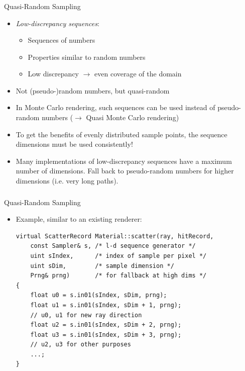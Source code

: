 \documentclass[utf8,stillsansserifmath,fleqn,t]{beamer}
\begin{document}
\begin{frame}[label=quasi-random]
\frametitle{\insertsection}
Quasi-Random Sampling
\begin{itemize}
\item \emph{Low-discrepancy sequences}:
    \begin{itemize}
    \item Sequences of numbers
    \item Properties similar to random numbers
    \item Low discrepancy $\rightarrow$ even coverage of the domain
    \end{itemize}
\item Not (pseudo-)random numbers, but quasi-random
\item In Monte Carlo rendering, such sequences can be used instead of pseudo-random numbers
($\rightarrow$ Quasi Monte Carlo rendering)
\item To get the benefits of evenly distributed sample points,
the sequence dimensions must be used consistently!
\item Many implementations of low-discrepancy sequences have a maximum number of
dimensions. Fall back to pseudo-random numbers for higher dimensions (i.e. very
long paths).
\end{itemize}
\end{frame}

\begin{frame}[fragile]
\frametitle{\insertsection}
Quasi-Random Sampling
\begin{itemize}
\item Example, similar to an existing renderer:
\begin{lstlisting}
virtual ScatterRecord Material::scatter(ray, hitRecord,
    const Sampler& s, /* l-d sequence generator */
    uint sIndex,      /* index of sample per pixel */
    uint sDim,        /* sample dimension */
    Prng& prng)       /* for fallback at high dims */
{
    float u0 = s.in01(sIndex, sDim, prng);
    float u1 = s.in01(sIndex, sDim + 1, prng);
    // u0, u1 for new ray direction
    float u2 = s.in01(sIndex, sDim + 2, prng);
    float u3 = s.in01(sIndex, sDim + 3, prng);
    // u2, u3 for other purposes
    ...;
}
\end{lstlisting}
\end{itemize}
\end{frame}
\end{document}
